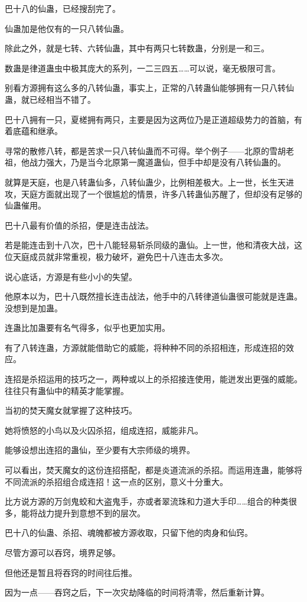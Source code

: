 \begin{this_body}
巴十八的仙蛊，已经搜刮完了。

仙蛊加是他仅有的一只八转仙蛊。

除此之外，就是七转、六转仙蛊，其中有两只七转数蛊，分别是一和三。

数蛊是律道蛊虫中极其庞大的系列，一二三四五……可以说，毫无极限可言。

别看方源拥有这么多的八转仙蛊，事实上，正常的八转蛊仙能够拥有一只八转仙蛊，就已经相当不错了。

巴十八拥有一只，夏槎拥有两只，主要是因为这两位乃是正道超级势力的首脑，有着底蕴和继承。

寻常的散修八转，都是苦求一只八转仙蛊而不可得。举个例子——北原的雪胡老祖，他战力强大，乃是当今北原第一魔道蛊仙，但手中却是没有八转仙蛊的。

就算是天庭，也是八转蛊仙多，八转仙蛊少，比例相差极大。上一世，长生天进攻，天庭方面就出现了一个很尴尬的情景，许多八转蛊仙苏醒了，但却没有足够的仙蛊催用。

巴十八最有价值的杀招，便是连击战法。

若是能连击到十八次，巴十八能轻易斩杀同级的蛊仙。上一世，他和清夜大战，这位天庭成员就非常重视，极力破坏，避免巴十八连击太多次。

说心底话，方源是有些小小的失望。

他原本以为，巴十八既然擅长连击战法，他手中的八转律道仙蛊很可能就是连蛊。没想到是加蛊。

连蛊比加蛊要有名气得多，似乎也更加实用。

有了八转连蛊，方源就能借助它的威能，将种种不同的杀招相连，形成连招的效应。

连招是杀招运用的技巧之一，两种或以上的杀招接连使用，能迸发出更强的威能。往往只有蛊仙中的精英才能掌握。

当初的焚天魔女就掌握了这种技巧。

她将愤怒的小鸟以及火囚杀招，组成连招，威能非凡。

能够设想出连招的蛊仙，至少要有大宗师级的境界。

可以看出，焚天魔女的这份连招搭配，都是炎道流派的杀招。而运用连蛊，能够将不同流派的杀招组合成连招！这一点的区别，意义十分重大。

比方说方源的万剑鬼蛟和大盗鬼手，亦或者翠流珠和力道大手印……组合的种类很多，能将战力提升到意想不到的层次。

巴十八的仙蛊、杀招、魂魄都被方源收取，只留下他的肉身和仙窍。

尽管方源可以吞窍，境界足够。

但他还是暂且将吞窍的时间往后推。

因为一点——吞窍之后，下一次灾劫降临的时间将清零，然后重新计算。


\end{this_body}
